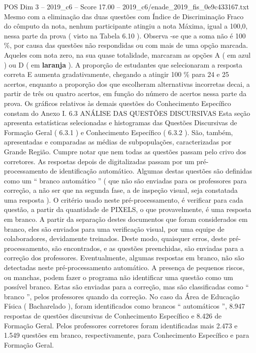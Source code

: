 \begin{textsample}{POS Dim 3 – 2019\_c6 – Score 17.00 – 2019\_c6/enade\_2019\_fis\_0e9c433167.txt}
Mesmo com a eliminação das duas questões com Índice de Discriminação Fraco do cômputo da nota, nenhum participante atingiu a nota Máxima, igual a 100,0, nessa parte da prova ( visto na Tabela 6.10 ).
Observa -se que a soma não é 100 \%, por causa das questões não respondidas ou com mais de uma opção marcada.
Aqueles com nota zero, na sua quase totalidade, marcaram as opções A ( em azul ) ou D ( em \textbf{laranja} ).
A proporção de estudantes que selecionaram a resposta correta E aumenta gradativamente, chegando a atingir 100 \% para 24 e 25 acertos, enquanto a proporção dos que escolheram alternativas incorretas decai, a partir de três ou quatro acertos, em função do número de acertos nessa parte da prova.
Os gráficos relativos às demais questões do Conhecimento Específico constam do Anexo I. 6.3 ANÁLISE DAS QUESTÕES DISCURSIVAS Esta seção apresenta estatísticas selecionadas e histogramas das Questões Discursivas de Formação Geral ( 6.3.1 ) e Conhecimento Específico ( 6.3.2 ).
São, também, apresentadas e comparadas as médias de subpopulações, caracterizadas por Grande Região.
Cumpre notar que nem todas as questões passam pelo crivo dos corretores.
As respostas depois de digitalizadas passam por um pré-processamento de identificação automático.
Algumas destas questões são definidas como um “ branco automático ” ( que não são enviadas para os professores para correção, a não ser que na segunda fase, a de inspeção visual, seja constatada uma resposta ).
O critério usado neste pré-processamento, é verificar para cada questão, a partir da quantidade de PIXELS, o que provavelmente, é uma resposta em branco.
A partir da separação destes documentos que foram considerados em branco, eles são enviados para uma verificação visual, por uma equipe de colaboradores, devidamente treinados.
Deste modo, quaisquer erros, deste pré-processamento, são encontrados, e as questões preenchidas, são enviadas para a correção dos professores.
Eventualmente, algumas respostas em branco, não são detectadas neste pré-processamento automático.
A presença de pequenos riscos, ou manchas, podem fazer o programa não identificar uma questão como um possível branco.
Estas são enviadas para a correção, mas são classificadas como “ branco ”, pelos professores quando da correção.
No caso da Área de Educação Física ( Bacharelado ), foram identificados como brancos “ automáticos ”, 8.947 respostas de questões discursivas de Conhecimento Específico e 8.426 de Formação Geral.
Pelos professores corretores foram identificadas mais 2.473 e 1.549 questões em branco, respectivamente, para Conhecimento Específico e para Formação Geral.

\end{textsample}
